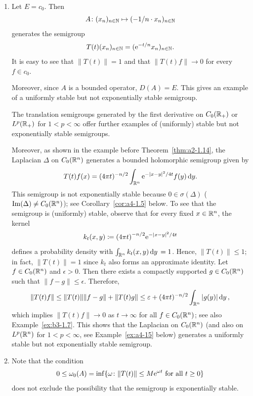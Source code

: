 \begin{example}\label{ex:a4-1.2}
\begin{enumerate}[\upshape (i), wide, labelindent=.25em]

\item 
Let $E = c_{0}$. 
Then 
\[
A \colon (x_{n})_{n \in \mathbb{N}} \mapsto (-1/n \cdot x_{n})_{n \in \mathbb{N}}
\] 
generates the semigroup 
\[
T(t)(x_{n})_{n \in \mathbb{N}} = (\mathrm{e}^{-t/n} x_{n})_{n \in \mathbb{N}}.
\]
It is easy to see that $\|T(t)\|=1$ and that $\|T(t)f\|\to 0$ for every $f \in c_{0}$.

Moreover, since $A$ is a bounded operator, $D(A) = E$.
This gives an example of a uniformly stable but not exponentially stable semigroup.

The translation semigroups generated by the first derivative on $C_0(\mathbb{R}_{+})$ or $L^{p}(\mathbb{R}_{+})$ for $1 < p < \infty$ offer further examples of (uniformly) stable but not exponentially stable semigroups.

Moreover, as shown in the example before Theorem~\ref{thm:a2-1.14},
the Laplacian $\Delta$ on $C_0(\mathbb{R}^{n})$ generates a bounded holomorphic semigroup given by 
\[
T(t)f(x) = (4\pi t)^{-n/2} \int_{\mathbb{R}^{n}} \mathrm{e}^{-|x-y|^{2}/4t} f(y)  \mathop{}\!\mathrm{d}{y} .
\]
This semigroup is not exponentially stable because $0 \in \sigma(\Delta)$ ($\mathop{}\!\mathrm{Im}(\Delta) \not= C_0(\mathbb{R}^{n})$); see Corollary~\ref{cor:a4-1.5} below. To see that the semigroup is (uniformly) stable, observe that for every fixed $x\in\mathbb{R}^n$, the kernel 
%
\[
	k_t(x,y) \coloneq  \mleft(4\pi t\mright)^{-n/2} \eu^{-|x-y|^{2}/4t}
\]
%
defines a probability density with $\int_{\mathbb{R}^n} k_t(x,y) \mathop{}\!\mathrm{d}{y}\, = 1$. Hence, $\|T(t)\|  \leq 1$; in fact, $\|T(t)\| = 1$ since $k_t$ also forms an approximate identity. Let $f \in C_0(\mathbb{R}^{n})$ and $\epsilon > 0$. Then there exists a compactly supported $g \in C_0(\mathbb{R}^{n})$ such that $\|f-g\|  \leq \epsilon$. Therefore,
\[
\|T(t)f\|  \leq  \|T(t)\|\|f-g\| + \|T(t)g\|  \leq \epsilon + (4\pi t)^{-n/2} \int_{\R^{n}} |g(y)|  \dy\, ,
\]
which implies  $\|T(t)f\| \to 0$ as $t\to\infty$ for all $f \in C_0(\mathbb{R}^{n})$; see also Example~\ref{ex:b3-1.7}.
This shows that the Laplacian on $C_0(\mathbb{R}^{n})$ (and also on $L^{p}(\mathbb{R}^{n})$ for $1 < p < \infty$, see 
Example~\ref{ex:a4-15} below) generates a uniformly stable but not exponentially stable semigroup.

\item 
Note that the condition 
\[
0 \leq \omega_{0}(A) = \inf\{\omega\colon\|T(t)\| \leq M\eu^{\omega t} \text{ for all } t \geq 0\}
\]
does not exclude the possibility that the semigroup is exponentially stable.


\end{enumerate}
\end{example}
